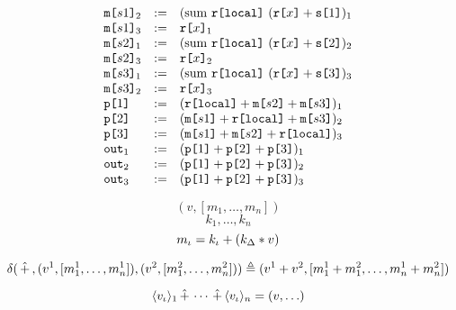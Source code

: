 $$
\begin{array}{lll}
  \texttt{m[}s1\texttt{]}_{2} &:=& (\mathrm{sum}\ \texttt{r[}\mathtt{local}\texttt{]}\ (\texttt{r[}x\texttt{]} + \texttt{s[}1\texttt{]})_{1} \\ 
  \texttt{m[}s1\texttt{]}_{3} &:=& \texttt{r[}x\texttt{]}_{1} \\ 
  \texttt{m[}s2\texttt{]}_{1} &:=& (\mathrm{sum}\ \texttt{r[}\mathtt{local}\texttt{]}\ (\texttt{r[}x\texttt{]} + \texttt{s[}2\texttt{]})_{2} \\ 
  \texttt{m[}s2\texttt{]}_{3} &:=& \texttt{r[}x\texttt{]}_{2} \\ 
  \texttt{m[}s3\texttt{]}_{1} &:=& (\mathrm{sum}\ \texttt{r[}\mathtt{local}\texttt{]}\ (\texttt{r[}x\texttt{]} + \texttt{s[}3\texttt{]})_{3} \\ 
  \texttt{m[}s3\texttt{]}_{2} &:=& \texttt{r[}x\texttt{]}_{3} \\ 
  \texttt{p[}1\texttt{]} &:=& (\texttt{r[}\mathtt{local}\texttt{]} + \texttt{m[}s2\texttt{]} + \texttt{m[}s3\texttt{]})_{1} \\ 
  \texttt{p[}2\texttt{]} &:=& (\texttt{m[}s1\texttt{]} + \texttt{r[}\mathtt{local}\texttt{]} + \texttt{m[}s3\texttt{]})_{2} \\
  \texttt{p[}3\texttt{]} &:=& (\texttt{m[}s1\texttt{]} + \texttt{m[}s2\texttt{]} + \texttt{r[}\mathtt{local}\texttt{]})_{3} \\ 
  \texttt{out}_{1} &:=& (\texttt{p[}1\texttt{]} + \texttt{p[}2\texttt{]} + \texttt{p[}3\texttt{]})_{1}\\
  \texttt{out}_{2} &:=& (\texttt{p[}1\texttt{]} + \texttt{p[}2\texttt{]} + \texttt{p[}3\texttt{]})_{2}\\
  \texttt{out}_{3} &:=& (\texttt{p[}1\texttt{]} + \texttt{p[}2\texttt{]} + \texttt{p[}3\texttt{]})_{3}
\end{array}
$$

$$
(v, [m_1,\ldots,m_n])
$$
$$
k_1,\ldots,k_n
$$
$$
m_\iota = k_\iota + (k_\Delta * v)
$$

$$
\delta(\,\hat{+}\,,(v^1, [m_1^1,\ldots,m^1_n]),(v^2, [m_1^2,\ldots,m^2_n]))
\triangleq
(v^1 + v^2, [m_1^1 + m_1^2 ,\ldots,m^1_n + m_n^2])
$$

$$
\langle v_{\iota} \rangle_{1} \,\hat{+}\, \cdots \,\hat{+}\, \langle v_{\iota} \rangle_{n} =
(v,\ldots)
$$

